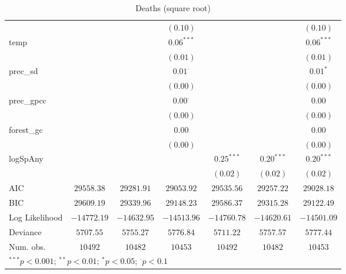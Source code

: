 \begin{sidewaystable}
\begin{center}
{\begin{tabular}{l c c c c c c}
                &               &               & $(0.10)$       &               &               & $(0.10)$      \\
temp            &               &               & $0.06^{***}$   &               &               & $0.06^{***}$  \\
                &               &               & $(0.01)$       &               &               & $(0.01)$      \\
prec\_sd        &               &               & $0.01^{\cdot}$ &               &               & $0.01^{*}$    \\
                &               &               & $(0.00)$       &               &               & $(0.00)$      \\
prec\_gpcc      &               &               & $0.00^{\cdot}$ &               &               & $0.00$        \\
                &               &               & $(0.00)$       &               &               & $(0.00)$      \\
forest\_gc      &               &               & $0.00$         &               &               & $0.00$        \\
                &               &               & $(0.00)$       &               &               & $(0.00)$      \\
logSpAny        &               &               &                & $0.25^{***}$  & $0.20^{***}$  & $0.20^{***}$  \\
                &               &               &                & $(0.02)$      & $(0.02)$      & $(0.02)$      \\
\hline
AIC             & $29558.38$    & $29281.91$    & $29053.92$     & $29535.56$    & $29257.22$    & $29028.18$    \\
BIC             & $29609.19$    & $29339.96$    & $29148.23$     & $29586.37$    & $29315.28$    & $29122.49$    \\
Log Likelihood  & $-14772.19$   & $-14632.95$   & $-14513.96$    & $-14760.78$   & $-14620.61$   & $-14501.09$   \\
Deviance        & $5707.55$     & $5755.27$     & $5776.84$      & $5711.22$     & $5757.57$     & $5777.44$     \\
Num. obs.       & $10492$       & $10482$       & $10453$        & $10492$       & $10482$       & $10453$       \\
\hline
\multicolumn{7}{l}{\scriptsize{$^{***}p<0.001$; $^{**}p<0.01$; $^{*}p<0.05$; $^{\cdot}p<0.1$}}
\end{tabular}
}
\caption{Deaths (square root)}
\label{sqrtDeaths}
\end{center}
\end{sidewaystable}
